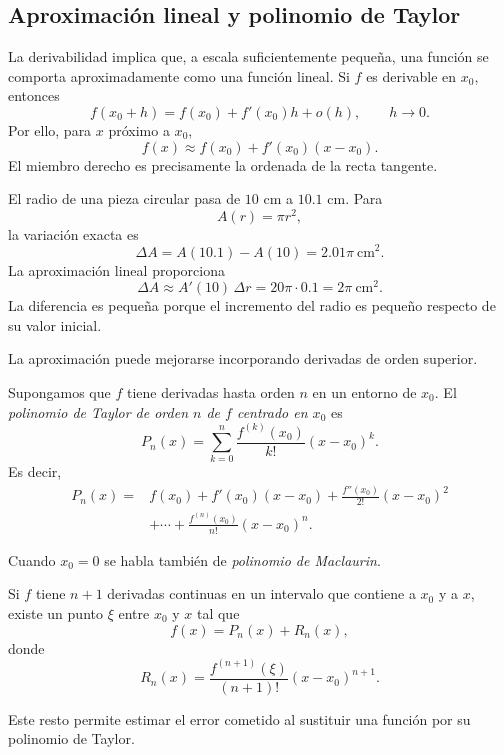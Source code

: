 \subsection{Aproximación lineal y polinomio de Taylor}

La derivabilidad implica que, a escala suficientemente pequeña, una función se comporta aproximadamente como una función lineal. Si $f$ es derivable en $x_0$, entonces
\[
f(x_0+h)=f(x_0)+f'(x_0)h+o(h),
\qquad h\to0.
\]
Por ello, para $x$ próximo a $x_0$,
\[
\boxed{
f(x)\approx f(x_0)+f'(x_0)(x-x_0)
}.
\]
El miembro derecho es precisamente la ordenada de la recta tangente.

\begin{example}
El radio de una pieza circular pasa de $10$ cm a $10.1$ cm. Para
\[
A(r)=\pi r^2,
\]
la variación exacta es
\[
\Delta A=A(10.1)-A(10)=2.01\pi\ \mathrm{cm}^2.
\]
La aproximación lineal proporciona
\[
\Delta A\approx A'(10)\,\Delta r
=20\pi\cdot0.1
=2\pi\ \mathrm{cm}^2.
\]
La diferencia es pequeña porque el incremento del radio es pequeño respecto de su valor inicial.
\end{example}

La aproximación puede mejorarse incorporando derivadas de orden superior.

\begin{definition}
Supongamos que $f$ tiene derivadas hasta orden $n$ en un entorno de $x_0$. El \emph{polinomio de Taylor de orden $n$ de $f$ centrado en $x_0$} es
\[
P_n(x)
=
\sum_{k=0}^n\frac{f^{(k)}(x_0)}{k!}(x-x_0)^k.
\]
Es decir,
\begin{align*}
P_n(x)={}&f(x_0)+f'(x_0)(x-x_0)
+\frac{f''(x_0)}{2!}(x-x_0)^2\\
&+\cdots
+\frac{f^{(n)}(x_0)}{n!}(x-x_0)^n.
\end{align*}
\end{definition}

Cuando $x_0=0$ se habla también de \emph{polinomio de Maclaurin}.

\begin{theorem}
Si $f$ tiene $n+1$ derivadas continuas en un intervalo que contiene a $x_0$ y a $x$, existe un punto $\xi$ entre $x_0$ y $x$ tal que
\[
f(x)=P_n(x)+R_n(x),
\]
donde
\[
R_n(x)=\frac{f^{(n+1)}(\xi)}{(n+1)!}(x-x_0)^{n+1}.
\]
\end{theorem}

Este resto permite estimar el error cometido al sustituir una función por su polinomio de Taylor.

